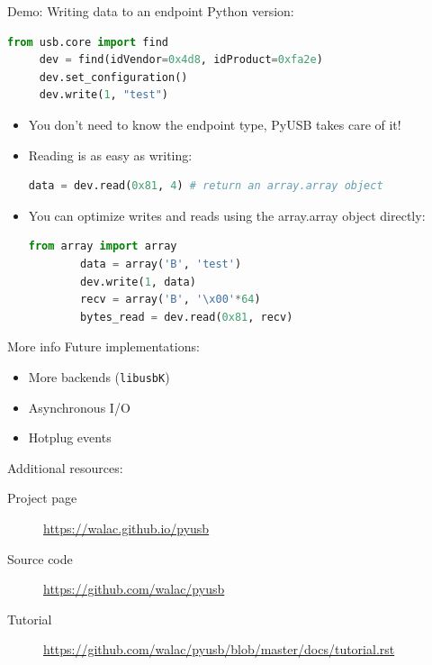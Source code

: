 \documentclass[pdf]{beamer}
\begin{document}
\begin{frame}[fragile]{Demo: Writing data to an endpoint}
  \tiny
  \pause
  Python version:
  \pause
  \begin{lstlisting}[language=Python]
     from usb.core import find
     dev = find(idVendor=0x4d8, idProduct=0xfa2e)
     dev.set_configuration()
     dev.write(1, "test")
  \end{lstlisting}

  \begin{itemize}
    \tiny
    \pause
    \item You don't need to know the endpoint type, PyUSB takes care of it!
    \pause
    \item Reading is as easy as writing:
    \begin{lstlisting}[language=Python]
      data = dev.read(0x81, 4) # return an array.array object
    \end{lstlisting}
    \pause
    \item You can optimize writes and reads using the array.array object directly:
      \begin{lstlisting}[language=Python]
        from array import array
        data = array('B', 'test')
        dev.write(1, data)
        recv = array('B', '\x00'*64)
        bytes_read = dev.read(0x81, recv)
      \end{lstlisting}
  \end{itemize}
\end{frame}

\begin{frame}{More info}
  Future implementations:
  \begin{itemize}
    \item More backends (\texttt{libusbK})
    \item Asynchronous I/O
    \item Hotplug events
  \end{itemize}

  Additional resources:
  \begin{description}
    \item[Project page] \url{https://walac.github.io/pyusb}
    \item[Source code] \url{https://github.com/walac/pyusb}
    \item[Tutorial] \url{https://github.com/walac/pyusb/blob/master/docs/tutorial.rst}
  \end{description}
\end{frame}
\end{document}
